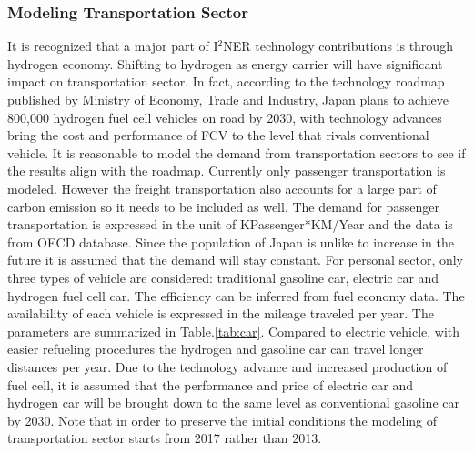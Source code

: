 \documentclass[14pt,a4paper]{article} %
\begin{document}
\subsubsection{Modeling Transportation Sector}
It is recognized that a major part of I$^2$NER technology contributions is through hydrogen economy. Shifting to hydrogen as energy carrier will have significant impact on transportation sector. In fact, according to the technology roadmap published by Ministry of Economy, Trade and Industry, Japan plans to achieve 800,000 hydrogen fuel cell vehicles on road by 2030, with technology advances bring the cost and performance of FCV to the level that rivals conventional vehicle\cite{japan_fc_roadmap}. It is reasonable to model the demand from transportation sectors to see if the results align with the roadmap.
Currently only passenger transportation is modeled. However the freight transportation also accounts for a large part of carbon emission so it needs to be included as well.
The demand for passenger transportation is expressed in the unit of KPassenger*KM/Year and the data is from OECD database\cite{oecd}. Since the population of Japan is unlike to increase in the future it is assumed that the demand will stay constant. For personal sector, only three types of vehicle are considered: traditional gasoline car, electric car and hydrogen fuel cell car. The efficiency can be inferred from fuel economy data. The availability of each vehicle is expressed in the mileage traveled per year. The parameters are summarized in Table.\ref{tab:car}. Compared to electric vehicle, with easier refueling procedures the hydrogen and gasoline car can travel longer distances per year. Due to the technology advance and increased production of fuel cell, it is assumed that the performance and price of electric car and hydrogen car will be brought down to the same level as conventional gasoline car by 2030. Note that in order to preserve the initial conditions the modeling of transportation sector starts from 2017 rather than 2013.
\end{document}
